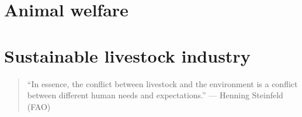 \documentclass[]{book}
\begin{document}
\chapter{Animal welfare}\label{animal-welfare}

\chapter{Sustainable livestock
industry}\label{sustainable-livestock-industry}

\begin{quote}
``In essence, the conflict between livestock and the environment is a
conflict between different human needs and expectations.'' --- Henning
Steinfeld (FAO)
\end{quote}


\end{document}
